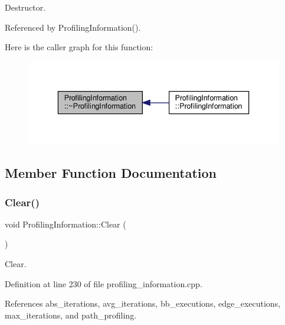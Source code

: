 Destructor. 



Referenced by Profiling\+Information().

Here is the caller graph for this function\+:
\nopagebreak
\begin{figure}[H]
\begin{center}
\leavevmode
\includegraphics[width=336pt]{dd/d5b/classProfilingInformation_aa1a69b2ac74f607c5cd739b1d23fcc97_icgraph}
\end{center}
\end{figure}


\subsection{Member Function Documentation}
\mbox{\label{classProfilingInformation_ad3818cd6989e87b00623689163f55c85}} 
\subsubsection{\texorpdfstring{Clear()}{Clear()}}
{\footnotesize\ttfamily void Profiling\+Information\+::\+Clear (\begin{DoxyParamCaption}{ }\end{DoxyParamCaption})}



Clear. 



Definition at line 230 of file profiling\+\_\+information.\+cpp.



References abs\+\_\+iterations, avg\+\_\+iterations, bb\+\_\+executions, edge\+\_\+executions, max\+\_\+iterations, and path\+\_\+profiling.

\mbox{\label{classProfilingInformation_a2781e0a52b9f9d531365a5520b4af3fe}} 
